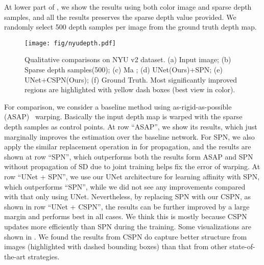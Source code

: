 At lower part of , we show the results using both color image and sparse depth samples, and all the results preserves the sparse depth value provided. We randomly select 500 depth samples per image from the ground truth depth map. 

\begin{figure}[t]
\centering
\texttt{[image: fig/nyudepth.pdf]}
\caption{Qualitative comparisons on NYU v2 dataset. (a) Input image; (b) Sparse depth samples(500); (c) Ma \etal \cite{Ma2017SparseToDense}; (d) UNet(Ours)+SPN\cite{liu2016learning}; (e) UNet+CSPN(Ours); (f) Ground Truth. Most significantly improved regions are highlighted with yellow dash boxes (best view in color).}
\label{fig:nyudepth}
\end{figure}

For comparison, we consider a baseline method using as-rigid-as-possible (ASAP)~\cite{igarashi2005rigid} warping. Basically the input depth map is warped with the sparse depth samples as control points. At row ``ASAP'', we show its results, which just marginally improves the estimation over the baseline network. For SPN, we also apply the similar replacement operation in  for propagation, and the results are shown at row ``SPN'', which outperforms both the results form ASAP and SPN without propagation of SD due to joint training helps fix the error of warping.  At row ``UNet + SPN'', we use our UNet architecture for learning affinity with SPN, which outperforms ``SPN'', while we did not see any improvements compared with that only using UNet. 
Nevertheless, by replacing SPN with our CSPN, as shown in row ``UNet + CSPN'', the results can be further improved by a large margin and performs best in all cases. We think this is mostly because CSPN updates more efficiently than SPN during the training. 
Some visualizations are shown in . We found the results from CSPN do capture better structure from images (highlighted with dashed bounding boxes) than that from other state-of-the-art strategies.

